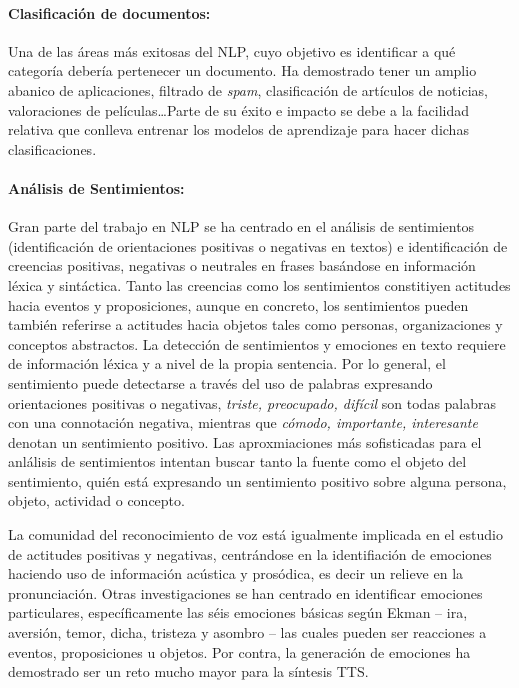 \paragraph{Clasificación de documentos:} Una de las áreas más exitosas del
\ac{NLP}, cuyo objetivo es identificar a qué categoría debería pertenecer un
documento. Ha demostrado tener un amplio abanico de aplicaciones, \eg filtrado
de \emph{spam}, clasificación de artículos de noticias, valoraciones de
películas\dots Parte de su éxito e impacto se debe a la facilidad relativa que
conlleva entrenar los modelos de aprendizaje para hacer dichas clasificaciones.

\paragraph{Análisis de Sentimientos:} Gran parte del trabajo en \ac{NLP} se ha
centrado en el análisis de sentimientos (identificación de orientaciones
positivas o negativas en textos) e identificación de creencias positivas,
negativas o neutrales en frases basándose en información léxica y
sintáctica. Tanto las creencias como los sentimientos constitiyen actitudes
hacia eventos y proposiciones, aunque en concreto, los sentimientos pueden
también referirse a actitudes hacia objetos tales como personas, organizaciones
y conceptos abstractos. La detección de sentimientos y emociones en texto
requiere de información léxica y a nivel de la propia sentencia. Por lo general,
el sentimiento puede detectarse a través del uso de palabras expresando
orientaciones positivas o negativas, \eg \emph{triste, preocupado, difícil} son
todas palabras con una connotación negativa, mientras que \emph{cómodo,
  importante, interesante} denotan un sentimiento positivo. Las aproxmiaciones
más sofisticadas para el anlálisis de sentimientos intentan buscar tanto la
fuente como el objeto del sentimiento, \eg quién está expresando un sentimiento
positivo sobre alguna persona, objeto, actividad o concepto.

La comunidad del reconocimiento de voz está igualmente implicada en el estudio
de actitudes positivas y negativas, centrándose en la identifiación de emociones
haciendo uso de información acústica y prosódica, es decir un relieve en la
pronunciación. Otras investigaciones se han centrado en identificar emociones
particulares, específicamente las séis emociones básicas según Ekman -- ira,
aversión, temor, dicha, tristeza y asombro -- las cuales pueden ser reacciones a
eventos, proposiciones u objetos. Por contra, la generación de emociones ha
demostrado ser un reto mucho mayor para la síntesis \ac{TTS}.

